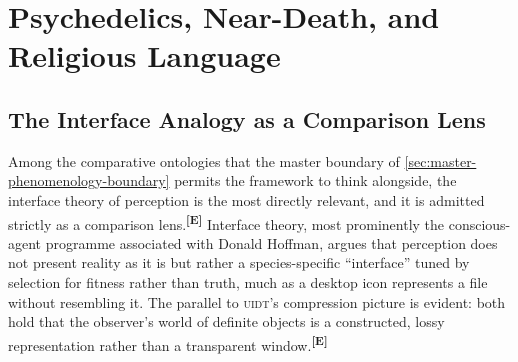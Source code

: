 \documentclass[12pt,a4paper,twoside]{article}
\theoremstyle{plain}
\theoremstyle{definition}
\theoremstyle{remark}
\newcommand{\UIDT}{\textsc{uidt}}
\newcommand{\catmark}[1]{\textsuperscript{\textsf{\textbf{[#1]}}}}
\begin{document}

\section{Psychedelics, Near-Death, and Religious Language}
\label{sec:dmt-nde-mysticism}

\subsection{The Interface Analogy as a Comparison Lens}
\label{subsec:interface-analogy}

Among the comparative ontologies that the master boundary of \cref{sec:master-phenomenology-boundary} permits the framework to think alongside, the interface theory of perception is the most directly relevant, and it is admitted strictly as a comparison lens.\catmark{E} Interface theory, most prominently the conscious-agent programme associated with Donald Hoffman, argues that perception does not present reality as it is but rather a species-specific ``interface'' tuned by selection for fitness rather than truth, much as a desktop icon represents a file without resembling it. The parallel to \UIDT's compression picture is evident: both hold that the observer's world of definite objects is a constructed, lossy representation rather than a transparent window.\catmark{E}
\end{document}
